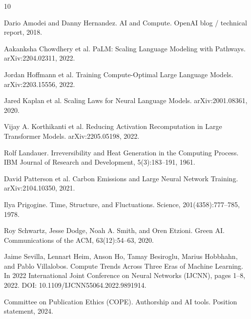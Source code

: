 \documentclass[11pt]{article}
\begin{document}
\begin{thebibliography}{10}

Dario Amodei and Danny Hernandez.
\newblock AI and Compute.
\newblock OpenAI blog / technical report, 2018.

Aakanksha Chowdhery et al.
\newblock PaLM: Scaling Language Modeling with Pathways.
\newblock arXiv:2204.02311, 2022.

Jordan Hoffmann et al.
\newblock Training Compute-Optimal Large Language Models.
\newblock arXiv:2203.15556, 2022.

Jared Kaplan et al.
\newblock Scaling Laws for Neural Language Models.
\newblock arXiv:2001.08361, 2020.

Vijay A. Korthikanti et al.
\newblock Reducing Activation Recomputation in Large Transformer Models.
\newblock arXiv:2205.05198, 2022.

Rolf Landauer.
\newblock Irreversibility and Heat Generation in the Computing Process.
\newblock IBM Journal of Research and Development, 5(3):183--191, 1961.

David Patterson et al.
\newblock Carbon Emissions and Large Neural Network Training.
\newblock arXiv:2104.10350, 2021.

Ilya Prigogine.
\newblock Time, Structure, and Fluctuations.
\newblock Science, 201(4358):777--785, 1978.

Roy Schwartz, Jesse Dodge, Noah A. Smith, and Oren Etzioni.
\newblock Green AI.
\newblock Communications of the ACM, 63(12):54--63, 2020.

Jaime Sevilla, Lennart Heim, Anson Ho, Tamay Besiroglu, Marius Hobbhahn, and Pablo Villalobos.
\newblock Compute Trends Across Three Eras of Machine Learning.
\newblock In 2022 International Joint Conference on Neural Networks (IJCNN), pages 1--8, 2022. DOI: 10.1109/IJCNN55064.2022.9891914.

Committee on Publication Ethics (COPE).
\newblock Authorship and AI tools.
\newblock Position statement, 2024.

\end{thebibliography}
\end{document}
